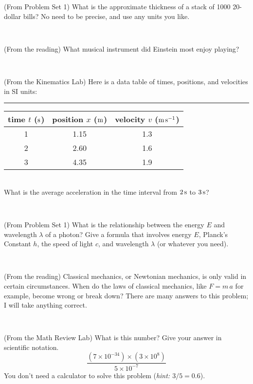 \documentclass[12pt, letterpaper]{article}
\begin{document}
\begin{problem} (From Problem Set 1)
What is the approximate thickness of a stack of 1000 20-dollar bills?
No need to be precise, and use any units you like.
\end{problem}


\vfill ~

\begin{problem} (From the reading)
What musical instrument did Einstein most enjoy playing?
\end{problem}


\vfill ~

\begin{problem} (From the Kinematics Lab)
Here is a data table of times, positions, and velocities in SI units:\\
\rule{1.0in}{0pt}\begin{tabular}{c|c|c}
time $t$ ($\mathrm{s}$) & position $x$ ($\mathrm{m}$) & velocity $v$ ($\mathrm{m}\,\mathrm{s}^{-1}$) \\
\hline
1 & 1.15 & 1.3 \\
2 & 2.60 & 1.6 \\
3 & 4.35 & 1.9 \\
\hline
\end{tabular}\\
What is the average acceleration in the time interval from $2\,\mathrm{s}$ to $3\,\mathrm{s}$?
\end{problem}


\vfill ~

\begin{problem} (From Problem Set 1)
What is the relationship between the energy $E$ and wavelength
$\lambda$ of a photon? Give a formula that involves energy $E$,
Planck's Constant $h$, the speed of light $c$, and wavelength
$\lambda$ (or whatever you need).
\end{problem}

\vfill ~


\clearpage


\begin{problem} (From the reading)
Classical mechanics, or Newtonian mechanics, is only valid in certain
circumstances. When do the laws of classical mechanics, like $F =
m\,a$ for example, become wrong or break down? There are many answers
to this problem; I will take anything correct.
\end{problem}


\vfill ~

\begin{problem} (From the Math Review Lab)
What is this number? Give your answer in scientific notation.
$$
\frac{(7\times10^{-34})\times(3\times10^8)}{5\times10^{-7}}
$$
You don't need a calculator to solve this problem (\textit{hint: $3/5=0.6$}).
\end{problem}
\end{document}

